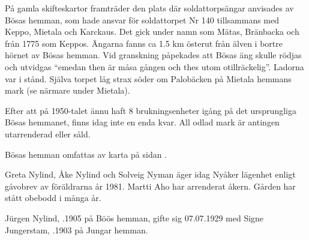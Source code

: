 På gamla skifteskartor framträder den plats där soldattorpsängar anvisades av Bösas hemman, som hade ansvar för soldattorpet Nr 140 tillsammans med Keppo, Mietala och Karckaus. Det gick under namn som Mätas, Bränbacka och från 1775 som Keppos. Ängarna fanns ca 1.5 km österut från älven i bortre hörnet av Bösas hemman. Vid granskning påpekades att Bösas äng skulle rödjas och utvidgas ``emedan then är måsa gången och thes utom otillräckelig''. Ladorna var i stånd. Själva torpet låg strax söder om Palobäcken på Mietala hemmans mark (se närmare under Mietala).

Efter att på 1950-talet ännu haft 8 brukningsenheter igång på det ursprungliga Bösas hemmanet, finns idag inte en enda kvar. All odlad  mark är antingen  utarrenderad eller såld.

Bösas hemman omfattas av karta  på sidan \pageref{map:12}.




%


%
Greta Nylind, Åke Nylind och Solveig Nyman äger idag Nyåker lägenhet enligt gåvobrev av föräldrarna år 1981.
Martti Aho har arrenderat åkern. Gården har stått obebodd i många år.



%
Jürgen Nylind, .1905 på Böös hemman, gifte sig 07.07.1929 med Signe Jungerstam, .1903 på Jungar hemman.
\begin{jhchildren}
  \item {}
  \item {}
  \item {}
  \item {}
  \item {}
  \item {}
\end{jhchildren}

